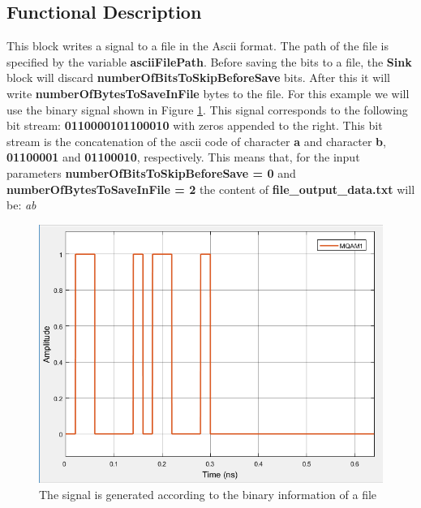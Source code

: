 \subsection*{Functional Description} 
This block writes a signal to a file in the Ascii format. The path of the file is specified by the variable \textbf{asciiFilePath}.
Before saving the bits to a file, the \textbf{Sink} block will discard \textbf{numberOfBitsToSkipBeforeSave} bits. After this it will write \textbf{numberOfBytesToSaveInFile} bytes to the file. For this example we will use the binary signal shown in Figure \ref{fig:generatedoutputsignalfile}. This signal corresponds to the following bit stream: \textbf{0110000101100010} with zeros appended to the right. This bit stream is the concatenation of the ascii code of character \textbf{a} and character \textbf{b}, \textbf{01100001} and \textbf{01100010}, respectively. This means that, for the input parameters \textbf{numberOfBitsToSkipBeforeSave = 0} and \textbf{numberOfBytesToSaveInFile = 2} the content of \textbf{file\_output\_data.txt} will be: \textit{ab}


\begin{figure}[h]
	\centering
\includegraphics[width=.6\linewidth]{./lib/binary_source/figures/generated_signal_file}
\caption{The signal is generated according to the binary information of a file}\label{fig:generatedoutputsignalfile}
\end{figure}
